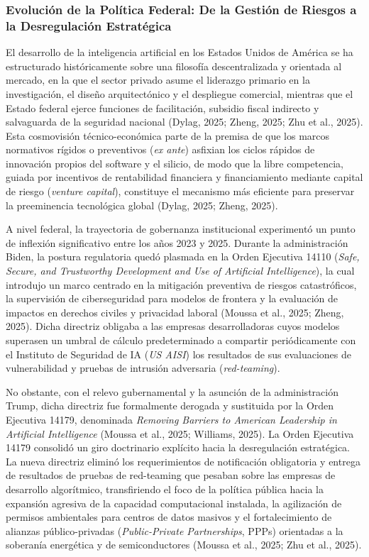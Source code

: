 \subsubsection{Evolución de la Política Federal: De la Gestión de Riesgos a la Desregulación Estratégica}

El desarrollo de la inteligencia artificial en los Estados Unidos de América se ha estructurado históricamente sobre una filosofía descentralizada y orientada al mercado, en la que el sector privado asume el liderazgo primario en la investigación, el diseño arquitectónico y el despliegue comercial, mientras que el Estado federal ejerce funciones de facilitación, subsidio fiscal indirecto y salvaguarda de la seguridad nacional (Dylag, 2025; Zheng, 2025; Zhu et al., 2025). Esta cosmovisión técnico-económica parte de la premisa de que los marcos normativos rígidos o preventivos (\textit{ex ante}) asfixian los ciclos rápidos de innovación propios del software y el silicio, de modo que la libre competencia, guiada por incentivos de rentabilidad financiera y financiamiento mediante capital de riesgo (\textit{venture capital}), constituye el mecanismo más eficiente para preservar la preeminencia tecnológica global (Dylag, 2025; Zheng, 2025).

A nivel federal, la trayectoria de gobernanza institucional experimentó un punto de inflexión significativo entre los años 2023 y 2025. Durante la administración Biden, la postura regulatoria quedó plasmada en la Orden Ejecutiva 14110 (\textit{Safe, Secure, and Trustworthy Development and Use of Artificial Intelligence}), la cual introdujo un marco centrado en la mitigación preventiva de riesgos catastróficos, la supervisión de ciberseguridad para modelos de frontera y la evaluación de impactos en derechos civiles y privacidad laboral (Moussa et al., 2025; Zheng, 2025). Dicha directriz obligaba a las empresas desarrolladoras cuyos modelos superasen un umbral de cálculo predeterminado a compartir periódicamente con el Instituto de Seguridad de IA (\textit{US AISI}) los resultados de sus evaluaciones de vulnerabilidad y pruebas de intrusión adversaria (\textit{red-teaming}).

No obstante, con el relevo gubernamental y la asunción de la administración Trump, dicha directriz fue formalmente derogada y sustituida por la Orden Ejecutiva 14179, denominada \textit{Removing Barriers to American Leadership in Artificial Intelligence} (Moussa et al., 2025; Williams, 2025). La Orden Ejecutiva 14179 consolidó un giro doctrinario explícito hacia la desregulación estratégica. La nueva directriz eliminó los requerimientos de notificación obligatoria y entrega de resultados de pruebas de red-teaming que pesaban sobre las empresas de desarrollo algorítmico, transfiriendo el foco de la política pública hacia la expansión agresiva de la capacidad computacional instalada, la agilización de permisos ambientales para centros de datos masivos y el fortalecimiento de alianzas público-privadas (\textit{Public-Private Partnerships}, PPPs) orientadas a la soberanía energética y de semiconductores (Moussa et al., 2025; Zhu et al., 2025). 

